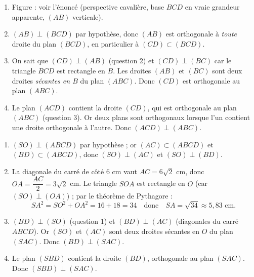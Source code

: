 \documentclass[11pt]{article}
\begin{document}
\begin{corrige}
\begin{enumerate}
\item Figure : voir l'énoncé (perspective cavalière, base $BCD$ en vraie grandeur apparente, $(AB)$ verticale).
\item $(AB) \perp (BCD)$ par hypothèse, donc $(AB)$ est orthogonale à \emph{toute} droite du plan $(BCD)$, en particulier à $(CD) \subset (BCD)$.
\item On sait que $(CD) \perp (AB)$ (question 2) et $(CD) \perp (BC)$ car le triangle $BCD$ est rectangle en $B$. Les droites $(AB)$ et $(BC)$ sont deux droites \emph{sécantes en $B$} du plan $(ABC)$. Donc $(CD)$ est orthogonale au plan $(ABC)$.
\item Le plan $(ACD)$ contient la droite $(CD)$, qui est orthogonale au plan $(ABC)$ (question 3). Or deux plans sont orthogonaux lorsque l'un contient une droite orthogonale à l'autre. Donc $(ACD) \perp (ABC)$.
\end{enumerate}
\end{corrige}

\begin{corrige}
\begin{enumerate}
\item $(SO) \perp (ABCD)$ par hypothèse ; or $(AC) \subset (ABCD)$ et $(BD) \subset (ABCD)$, donc $(SO) \perp (AC)$ et $(SO) \perp (BD)$.
\item La diagonale du carré de côté $6$ cm vaut $AC = 6\sqrt{2}$ cm, donc $OA = \dfrac{AC}{2} = 3\sqrt{2}$ cm. Le triangle $SOA$ est rectangle en $O$ (car $(SO) \perp (OA)$) ; par le théorème de Pythagore :
\[ SA^2 = SO^2 + OA^2 = 16 + 18 = 34 \quad \text{donc} \quad SA = \sqrt{34} \approx 5{,}83 \text{ cm}. \]
\item $(BD) \perp (SO)$ (question 1) et $(BD) \perp (AC)$ (diagonales du carré $ABCD$). Or $(SO)$ et $(AC)$ sont deux droites sécantes en $O$ du plan $(SAC)$. Donc $(BD) \perp (SAC)$.
\item Le plan $(SBD)$ contient la droite $(BD)$, orthogonale au plan $(SAC)$. Donc $(SBD) \perp (SAC)$.
\end{enumerate}
\end{corrige}
\end{document}
